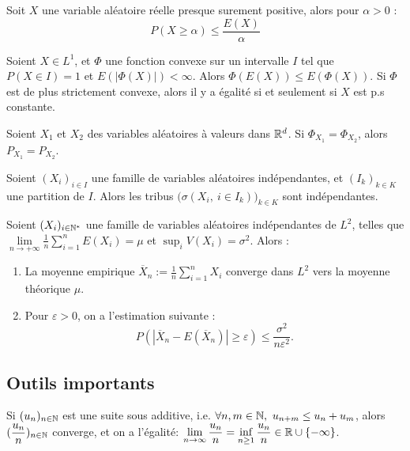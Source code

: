 \documentclass[11pt,a4paper]{article}
\begin{document}
\begin{thmstar}
 Soit $X$ une variable aléatoire réelle presque surement positive, alors pour $\alpha>0$ : \[P(X \geq \alpha) \leq \frac{E(X)}{\alpha}\]
\end{thmstar}

\begin{thmstar}
 Soient $X\in L^1$, et $\Phi$ une fonction convexe sur un intervalle $I$ tel que $P(X\in I)=1$ et $E(|\Phi(X)|)<\infty$. Alors $\Phi(E(X)) \leq E(\Phi(X))$. Si $\Phi$ est de plus strictement convexe, alors il y a égalité si et seulement si $X$ est p.s constante.
\end{thmstar}

\begin{thmstar}
Soient $X_1$ et $X_2$ des variables aléatoires à valeurs dans $\mathbb R^d$. Si $\Phi_{X_1}=\Phi_{X_2}$, alors $P_{X_1}=P_{X_2}$.
\end{thmstar}

\begin{thmstar}
[Coalitions] Soient $(X_i)_{i\in I}$ une famille de variables aléatoires indépendantes, et $(I_k)_{k\in K}$ une partition de $I$. Alors les tribus $\big(\sigma\left(X_i,\ i\in I_k\right)\big)_{k\in K}$ sont indépendantes.
\end{thmstar}

\begin{thmstar}
 Soient $(X_i)_{i\in \mathbb N^*}$ une famille de variables aléatoires indépendantes de $L^2$, telles que $\lim\limits_{n\to +\infty} \frac{1}{n}\sum_{i=1}^n E(X_i) = \mu$ et $\sup_i V(X_i) = \sigma^2$. Alors : 
\begin{enumerate}
\item La moyenne empirique $\displaystyle \overline{X}_n := \frac{1}{n}\sum_{i=1}^n X_i$ converge dans $L^2$ vers la moyenne théorique $\mu$.
\item Pour $\varepsilon >0$, on a l'estimation suivante : \[P(|\overline{X}_n - E(\overline{X}_n)| \geq \varepsilon) \leq \frac{\sigma^2}{n\varepsilon^2}.\]
\end{enumerate}
\end{thmstar}

\subsection*{Outils importants}

\begin{lemmastar}
[Fekete] Si $(u_n)_{n\in\mathbb N}$ est une suite sous additive, i.e. $\forall n,m\in \N, \ u_{n+m} \leq u_n + u_m$, alors $\displaystyle (\frac{u_n}{n})_{n\in\mathbb N}$ converge, et on a l'égalité:  $\displaystyle \lim\limits_{n\to \infty} \frac{u_n}{n}=\inf_{n\geq 1} \frac{u_n}{n} \in \mathbb R \cup \{ -\infty\}$.
\end{lemmastar}
\end{document}
